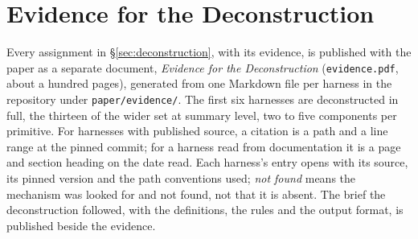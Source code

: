 \section{Evidence for the Deconstruction}
\label{app:evidence}
Every assignment in \S\ref{sec:deconstruction}, with its evidence, is published with the paper as a separate document, \emph{Evidence for the Deconstruction} (\texttt{evidence.pdf}, about a hundred pages), generated from one Markdown file per harness in the repository under \texttt{paper/evidence/}. The first six harnesses are deconstructed in full, the thirteen of the wider set at summary level, two to five components per primitive. For harnesses with published source, a citation is a path and a line range at the pinned commit; for a harness read from documentation it is a page and section heading on the date read. Each harness's entry opens with its source, its pinned version and the path conventions used; \emph{not found} means the mechanism was looked for and not found, not that it is absent. The brief the deconstruction followed, with the definitions, the rules and the output format, is published beside the evidence.
